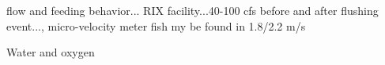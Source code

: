 \documentclass{article}
\begin{document}


flow and feeding behavior... RIX facility...40-100 cfs before and after flushing event..., micro-velocity meter fish my be found in 1.8/2.2 m/s

Water and oxygen
\end{document}
